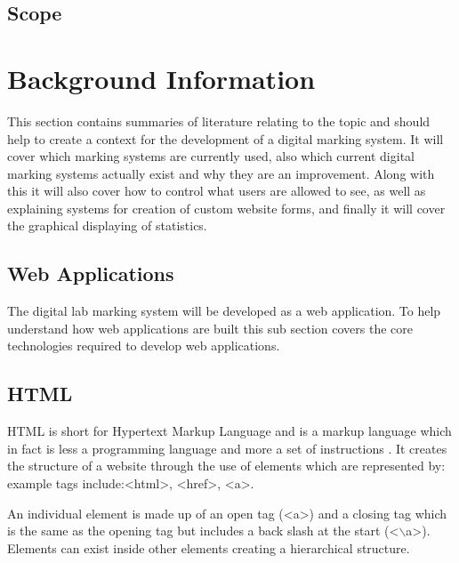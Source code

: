 \documentclass[12pt]{article}  %
\newcommand{\tag}[1]{\textless {#1}\textgreater}
\begin{document}
\subsection{Scope}





\newpage
\section{Background Information}
This section contains summaries of literature relating to the topic and should help to create a context for the development of a digital marking system. It will cover which marking systems are currently used, also which current digital marking systems actually exist and why they are an improvement. Along with this it will also cover how to control what users are allowed to see, as well as explaining systems for creation of custom website forms, and finally it will cover the graphical displaying of statistics. 


\subsection{Web Applications}

The digital lab marking system will be developed as a web application. To help understand how web applications are built this sub section covers the core technologies required to develop web applications.

\subsection{HTML}
HTML is short for Hypertext Markup Language and is a markup language which in fact is less a programming language and more a set of instructions \cite{brooks_introduction_2007}. It creates the structure of a website through the use of elements which are represented by: example tags include:\tag{html}, \tag{href}, \tag{a}. 

\noindent An individual element is made up of an open tag (\tag{a}) and a closing tag which is the same as the opening tag but includes a back slash at the start (\tag{$\backslash$a}). Elements can exist inside other elements creating a hierarchical structure.
\end{document}
